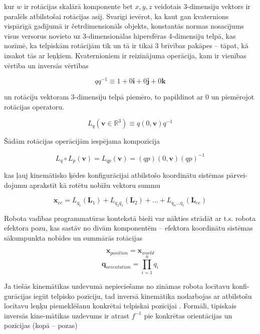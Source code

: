 \documentclass[12pt, a4paper]{article}
\numberwithin{equation}{section} %
\begin{document}
kur $w$ ir rotācijas skalārā komponente bet $x,y,z$ veidotais 3-dimensiju vektors ir paralēls atbilstošai rotācijas asij. Svarīgi ievērot, ka kaut gan kvaternions vispārīgā gadījumā ir četrdimensionāls objekts, konstantās normas nosacījums visus versorus novieto uz 3-dimensionālas hipersfēras 4-dimensiju telpā, kas nozīmē, ka telpiskām rotācijām tik un tā ir tikai 3 brīvības pakāpes -- tāpat, kā izsakot tās ar leņķiem. Kvaternioniem ir reizinājuma operācija, kam ir vienības vērtība un inversās vērtības

\begin{equation}
    qq^{-1} \equiv 1 +  0\boldsymbol{i} + 0\boldsymbol{j} + 0\boldsymbol{k}
\end{equation}

un rotāciju vektoram 3-dimensiju telpā piemēro, to papildinot ar 0 un piemērojot rotācijas operatoru.

\begin{equation}
    L_q(\boldsymbol{v} \in \mathbb{R}^3) \equiv q(0,\boldsymbol{v})q^{-1}
\end{equation}

Šādām rotācijas operācijām iespējama kompozīcija

\begin{equation}
    L_q \circ L_p (\boldsymbol{v}) = L_{qp}(\boldsymbol{v}) = (qp)(0,\boldsymbol{v})(qp)^{-1}
\end{equation}

kas ļauj kinemātisko ķēdes konfigurācijai atbilstošo koordinātu sistēmas pārvei-dojumu aprakstīt kā rotētu nobīžu vektoru summu

\begin{equation}
    \boldsymbol{x}_{ee} = L_{q_1}(\boldsymbol{L}_1) + L_{q_2q_1}(\boldsymbol{L}_2) + ... + L_{q_n...q_1}(\boldsymbol{L}_{ee})
\end{equation}

Robota vadības programmatūras kontekstā bieži var nākties strādāt ar t.s. robota efektora pozu, kas sastāv no divām komponentēm -- efektora koordinātu sistēmas sākumpunkta nobīdes un summārās rotācijas

\begin{equation}
    \boldsymbol{x}_{position} = \boldsymbol{x}_{world}
\end{equation}
\begin{equation}
    \boldsymbol{q}_{orientation} = \prod_{i=1}^n q_i
\end{equation}

Ja tiešās kinemātikas uzdevumā nepieciešams no zināmas robota locītavu konfi-gurācijas iegūt telpisko pozīciju, tad inversā kinemātika nodarbojas ar atbilstošu locītavu leņķu piemeklēšanu konkrētai telpiskai pozīcijai \cite{inverse_kinematics_illinois}. Formāli, tipiskais inversās kine-mātikas uzdevums ir atrast $f^{-1}$ pie konkrētas orientācijas un pozīcijas (kopā -- pozas)
\end{document}
